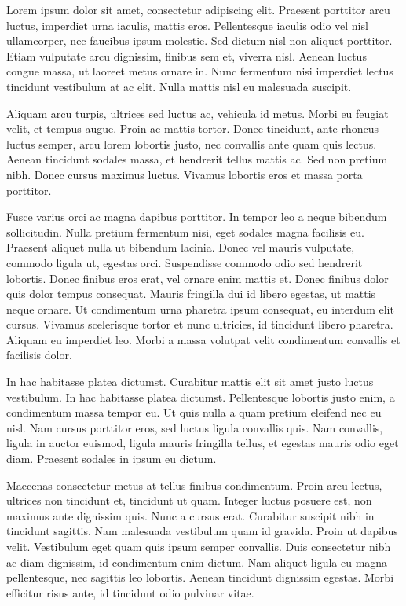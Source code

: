 \documentclass[
	a4paper, %
	10pt, %
]{CSMinimalMemo}
\begin{document}
\outputheader %


Lorem ipsum dolor sit amet, consectetur adipiscing elit. Praesent porttitor arcu luctus, imperdiet urna iaculis, mattis eros. Pellentesque iaculis odio vel nisl ullamcorper, nec faucibus ipsum molestie. Sed dictum nisl non aliquet porttitor. Etiam vulputate arcu dignissim, finibus sem et, viverra nisl. Aenean luctus congue massa, ut laoreet metus ornare in. Nunc fermentum nisi imperdiet lectus tincidunt vestibulum at ac elit. Nulla mattis nisl eu malesuada suscipit.

Aliquam arcu turpis, ultrices sed luctus ac, vehicula id metus. Morbi eu feugiat velit, et tempus augue. Proin ac mattis tortor. Donec tincidunt, ante rhoncus luctus semper, arcu lorem lobortis justo, nec convallis ante quam quis lectus. Aenean tincidunt sodales massa, et hendrerit tellus mattis ac. Sed non pretium nibh. Donec cursus maximus luctus. Vivamus lobortis eros et massa porta porttitor.

Fusce varius orci ac magna dapibus porttitor. In tempor leo a neque bibendum sollicitudin. Nulla pretium fermentum nisi, eget sodales magna facilisis eu. Praesent aliquet nulla ut bibendum lacinia. Donec vel mauris vulputate, commodo ligula ut, egestas orci. Suspendisse commodo odio sed hendrerit lobortis. Donec finibus eros erat, vel ornare enim mattis et. Donec finibus dolor quis dolor tempus consequat. Mauris fringilla dui id libero egestas, ut mattis neque ornare. Ut condimentum urna pharetra ipsum consequat, eu interdum elit cursus. Vivamus scelerisque tortor et nunc ultricies, id tincidunt libero pharetra. Aliquam eu imperdiet leo. Morbi a massa volutpat velit condimentum convallis et facilisis dolor.

In hac habitasse platea dictumst. Curabitur mattis elit sit amet justo luctus vestibulum. In hac habitasse platea dictumst. Pellentesque lobortis justo enim, a condimentum massa tempor eu. Ut quis nulla a quam pretium eleifend nec eu nisl. Nam cursus porttitor eros, sed luctus ligula convallis quis. Nam convallis, ligula in auctor euismod, ligula mauris fringilla tellus, et egestas mauris odio eget diam. Praesent sodales in ipsum eu dictum.

Maecenas consectetur metus at tellus finibus condimentum. Proin arcu lectus, ultrices non tincidunt et, tincidunt ut quam. Integer luctus posuere est, non maximus ante dignissim quis. Nunc a cursus erat. Curabitur suscipit nibh in tincidunt sagittis. Nam malesuada vestibulum quam id gravida. Proin ut dapibus velit. Vestibulum eget quam quis ipsum semper convallis. Duis consectetur nibh ac diam dignissim, id condimentum enim dictum. Nam aliquet ligula eu magna pellentesque, nec sagittis leo lobortis. Aenean tincidunt dignissim egestas. Morbi efficitur risus ante, id tincidunt odio pulvinar vitae.

\end{document}
